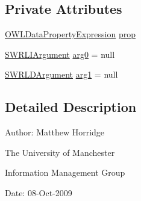 \subsection*{Private Attributes}
\begin{DoxyCompactItemize}
\item 
\hyperlink{interfaceorg_1_1semanticweb_1_1owlapi_1_1model_1_1_o_w_l_data_property_expression}{O\-W\-L\-Data\-Property\-Expression} \hyperlink{classorg_1_1coode_1_1owlapi_1_1owlxmlparser_1_1_s_w_r_l_data_property_atom_element_handler_abca3b0326e6e166d6f84c352bfdd4cf5}{prop}
\item 
\hyperlink{interfaceorg_1_1semanticweb_1_1owlapi_1_1model_1_1_s_w_r_l_i_argument}{S\-W\-R\-L\-I\-Argument} \hyperlink{classorg_1_1coode_1_1owlapi_1_1owlxmlparser_1_1_s_w_r_l_data_property_atom_element_handler_a4bf9aa148a142cf26ba16b9af0f1eef1}{arg0} = null
\item 
\hyperlink{interfaceorg_1_1semanticweb_1_1owlapi_1_1model_1_1_s_w_r_l_d_argument}{S\-W\-R\-L\-D\-Argument} \hyperlink{classorg_1_1coode_1_1owlapi_1_1owlxmlparser_1_1_s_w_r_l_data_property_atom_element_handler_a24d5af54f5ce691f9bc52d6b58544750}{arg1} = null
\end{DoxyCompactItemize}


\subsection{Detailed Description}
Author\-: Matthew Horridge\par
 The University of Manchester\par
 Information Management Group\par
 Date\-: 08-\/\-Oct-\/2009 

